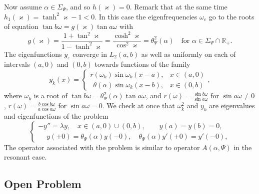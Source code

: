 \documentclass[11pt,english]{amsart}%
\DeclareMathOperator*{\csh}{cosh} \DeclareMathOperator*{\snh}{sinh}
\DeclareMathOperator*{\tnh}{tanh} \DeclareMathOperator*{\tng}{tan}
\begin{document}
Now assume $\alpha\in \Sigma_\Psi$, and so $h(\varkappa)=0$. Remark that at the same time
$h_1(\varkappa)=\tnh^2\varkappa-1<0$.
In this case the eigenfrequencies $\omega_\varepsilon$ go to the roots of equation
 $\tng b\omega=g(\varkappa)\tng a\omega$ with
$$
   g(\varkappa)=\frac{1+\tng^2\varkappa}{1-\tnh^2\varkappa}=\frac{\csh^2\varkappa}{\cos^2\varkappa}=\theta_\Psi^2 (\alpha)\quad\text{for } \alpha\in \Sigma_\Psi\cap\mathbb R_+.
$$
The eigenfunctions $y_\varepsilon$ converge in $L_2(a,b)$ as well as uniformly on each of intervals  $(a,0)$ and $(0,b)$ towards  functions of the family
\begin{equation*}
y_k(x)=
    \begin{cases}
       r(\omega_k)\sin\omega_k(x-a),&x\in(a,0)\\
    \:\:\theta(\alpha)\sin\omega_k(x-b),&x\in(0,b)
        \end{cases},
\end{equation*}
where $\omega_k$ is a root of  $\tng b\omega=\theta_\Psi^2 (\alpha)\tng a\omega$, and
$r(\omega)=\frac{\sin b\omega}{\sin a\omega}$ for $\sin a\omega\neq 0$,
$r(\omega)=\frac{b\cos b\omega}{a\cos a\omega}$ for $\sin a\omega= 0$.
We check at once that $\omega_k^2$ and  $y_k$ are eigenvalues and eigenfunctions of the problem
\begin{equation*}
\begin{cases}
  -y''=\lambda y, \quad x\in (a,0)\cup (0,b),\qquad y(a)=y(b)=0,\\
  \phantom{-}y(+0)=\theta_\Psi (\alpha)y(-0),\quad \theta_\Psi (\alpha)y'(+0)=y'(-0),
\end{cases}
\end{equation*}
The operator associated with the problem is similar to operator
$A(\alpha,\Psi)$ in the resonant case.




\subsection{Open Problem}
\end{document}
